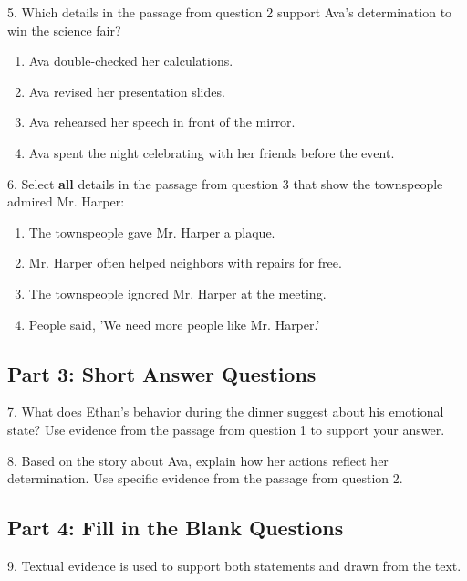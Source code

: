 \documentclass[12pt]{article}
\begin{document}
\vspace{1cm}

5. Which details in the passage from question 2 support Ava’s determination to win the science fair?  
\begin{enumerate}[label=\Alph*.]
    \item Ava double-checked her calculations.  
    \item Ava revised her presentation slides.  
    \item Ava rehearsed her speech in front of the mirror.  
    \item Ava spent the night celebrating with her friends before the event.  
\end{enumerate}

\vspace{1cm}

6. Select \textbf{all} details in the passage from question 3 that show the townspeople admired Mr. Harper:  
\begin{enumerate}[label=\Alph*.]
    \item The townspeople gave Mr. Harper a plaque.  
    \item Mr. Harper often helped neighbors with repairs for free.  
    \item The townspeople ignored Mr. Harper at the meeting.  
    \item People said, 'We need more people like Mr. Harper.'  
\end{enumerate}

\vspace{1cm}

\subsection*{Part 3: Short Answer Questions}

7. What does Ethan’s behavior during the dinner suggest about his emotional state? Use evidence from the passage from question 1 to support your answer.  
\vspace{4cm}

8. Based on the story about Ava, explain how her actions reflect her determination. Use specific evidence from the passage from question 2.  
\vspace{4cm}

\subsection*{Part 4: Fill in the Blank Questions}
\vspace{1cm}
9. Textual evidence is used to support both \underline{\hspace{4cm}} statements and \underline{\hspace{4cm}} drawn from the text.  
\vspace{2cm}
\end{document}
